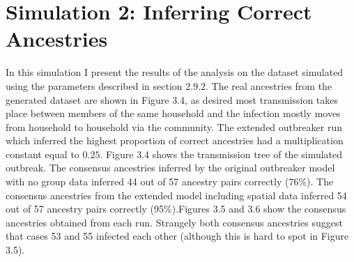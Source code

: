 \documentclass[11pt,a4paper]{report}
\begin{document}
\section{Simulation 2: Inferring Correct Ancestries}
In this simulation I present the results of the analysis on the dataset simulated using the parameters described in section 2.9.2. The real ancestries from the generated dataset are shown in Figure 3.4, as desired most transmission takes place between members of the same household and the infection mostly moves from household to household via the community. The extended outbreaker run which inferred the highest proportion of correct ancestries had a multiplication constant equal to $0.25$. Figure 3.4 shows the transmission tree of the simulated outbreak. The consensus ancestries inferred by the original outbreaker model with no group data inferred 44 out of 57 ancestry pairs correctly (76\%). The consensus ancestries from the extended model including spatial data inferred 54 out of 57 ancestry pairs correctly (95\%).Figures 3.5 and 3.6 show the consensus ancestries obtained from each run. Strangely both consensus ancestries suggest that cases 53 and 55 infected each other (although this is hard to spot in Figure 3.5).
\end{document}
